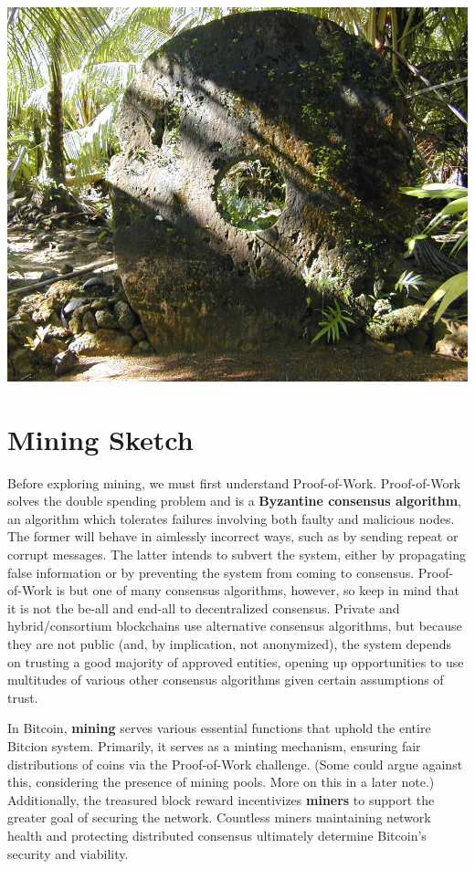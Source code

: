 \documentclass[full.tex]{subfiles}
\begin{document}
    \begin{center}
    \includegraphics[scale=0.7]{rai}
    \end{center}
    
    \section*{Mining Sketch}
    
    Before exploring mining, we must first understand Proof-of-Work. Proof-of-Work solves the double spending problem and is a \textbf{Byzantine consensus algorithm}, an algorithm which tolerates failures involving both faulty and malicious nodes. The former will behave in aimlessly incorrect ways, such as by sending repeat or corrupt messages. The latter intends to subvert the system, either by propagating false information or by preventing the system from coming to consensus. Proof-of-Work is but one of many consensus algorithms, however, so keep in mind that it is not the be-all and end-all to decentralized consensus. Private and hybrid/consortium blockchains use alternative consensus algorithms, but because they are not public (and, by implication, not anonymized), the system depends on trusting a good majority of approved entities, opening up opportunities to use multitudes of various other consensus algorithms given certain assumptions of trust.
    
    In Bitcoin, \textbf{mining} serves various essential functions that uphold the entire Bitcion system. Primarily, it serves as a minting mechanism, ensuring fair distributions of coins via the Proof-of-Work challenge. (Some could argue against this, considering the presence of mining pools. More on this in a later note.) Additionally, the treasured block reward incentivizes \textbf{miners} to support the greater goal of securing the network. Countless miners maintaining network health and protecting distributed consensus ultimately determine Bitcoin's security and viability.
    
\end{document}
